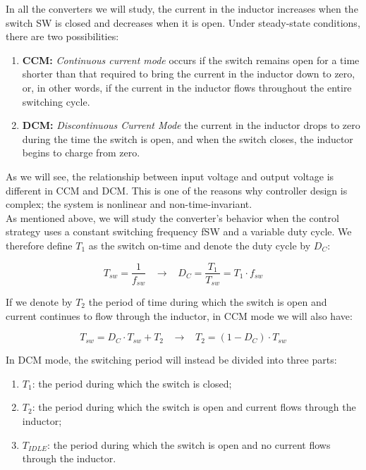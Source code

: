 \documentclass[../main.tex]{subfiles}
\begin{document}
In all the converters we will study, the current in the inductor increases when the switch SW is closed and decreases when it is open. Under steady-state conditions, there are two possibilities:


\begin{enumerate}[label=\textbf{-}]
	\item \textbf{CCM:} \textit{Continuous current mode} occurs if the switch remains open for a time shorter than that required to bring the current in the inductor down to zero, or, in other words, if the current in the inductor flows throughout the entire switching cycle.
	\item \textbf{DCM:} \textit{Discontinuous Current Mode} the current in the inductor drops to zero during the time the switch is open, and when the switch closes, the inductor begins to charge from zero.
\end{enumerate}


As we will see, the relationship between input voltage and output voltage is different in CCM and DCM. This is one of the reasons why controller design is complex; the system is nonlinear and non-time-invariant.\\

As mentioned above, we will study the converter’s behavior when the control strategy uses a constant switching frequency fSW and a variable duty cycle. We therefore define $T_1$ as the switch on-time and denote the duty cycle by $D_C$:

\begin{equation}
	T_{sw} = \frac{1}{f_{sw}} \hspace{10pt} \rightarrow \hspace{10pt} D_C = \frac{T_1}{T_{sw}} = T_1 \cdot f_{sw}
\end{equation}


If we denote by $T_2$ the period of time during which the switch is open and current continues to flow through the inductor, in CCM mode we will also have:

\begin{equation}
	T_{sw} = D_C \cdot T_{sw} + T_2 \hspace{10pt} \rightarrow \hspace{10pt} T_2 = (1 - D_C) \cdot T_{sw}
\end{equation}

In DCM mode, the switching period will instead be divided into three parts:

\begin{enumerate}[label=\textbf{-}]
	\item $T_1$: the period during which the switch is closed;
	\item $T_2$: the period during which the switch is open and current flows through the inductor;
	\item $T_{IDLE}$: the period during which the switch is open and no current flows through the inductor.

\end{enumerate}
\end{document}
